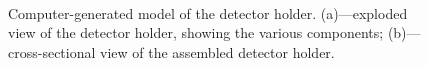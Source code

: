 \begin{figure}[tb]
\begin{center}
\\
\caption[Detector holder]{Computer-generated model of the detector holder. (a)---exploded view of the detector holder, showing the various components; (b)---cross-sectional view of the assembled detector holder.}
\label{fig:deviceHolder}
\end{center}
\end{figure}
